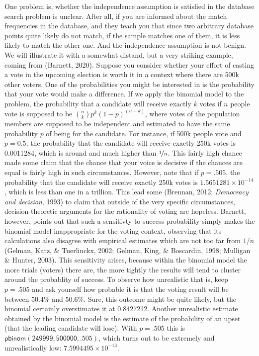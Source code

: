 \documentclass[10pt,dvipsnames,enabledeprecatedfontcommands]{scrartcl}
\begin{document}
One problem is, whether the independence assumption is satisfied in the
database search problem is unclear. After all, if you are informed about
the match frequencies in the database, and they teach you that since two
arbitrary database points quite likely do not match, if the sample
matches one of them, it is less likely to match the other one. And the
independence assumption is not benign. We will illustrate it with a
somewhat distand, but a very striking example, coming from (Barnett,
2020). Suppose you consider whether your effort of casting a vote in the
upcoming election is worth it in a context where there are 500k other
voters. One of the probabilities you might be interested in is the
probability that your vote would make a difference. If we apply the
binomial model to the problem, the probability that a candidate will
receive exactly \(k\) votes if \(n\) people vote is supposed to be
\({n \choose k} p^{k} (1-p)^{(n-k)}\), where votes of the population
members are supposed to be independent and estimated to have the same
probability \(p\) of being for the candidate. For instance, if 500k
people vote and \(p= 0.5\), the probability that the candidate will
receive exactly 250k votes is 0.0011284, which is around
 and much higher than \(\nicefrac{1}{n}\). This fairly
high chance made some claim that the chance that your voice is decisive
if the chances are equal is fairly high in such circumstances. However,
note that if \(p=.505\), the probability that the candidate will receive
exactly 250k votes is \ensuremath{1.5651281\times 10^{-14}}, which is
less than one in a trillion. This lead some (Brennan, 2012;
\emph{Democracy and decision}, 1993) to claim that outside of the very
specific circumstances, decision-theoretic arguments for the rationality
of voting are hopeless. Barnett, however, points out that such a
sensitivty to success probability simply makes the binomial model
inappropriate for the voting context, observing that its calculations
also disagree with empirical estimates which are not too far from
\(1/n\) (Gelman, Katz, \& Tuerlinckx, 2002; Gelman, King, \& Boscardin,
1998; Mulligan \& Hunter, 2003). This sensitivity arises, because within
the binomial model the more trials (voters) there are, the more tightly
the results will tend to cluster around the probablity of success. To
observe how unrealistic that is, keep \(p=.505\) and ask yourself how
probable it is that the voting result will be between \(50.4\%\) and
\(50.6\%\). Sure, this outcome might be quite likely, but the binomial
certainly overstimates it at 0.8427212. Another unrealistic estimate
obtained by the binomial model is the estimate of the probability of an
upset (that the leading candidate will lose). With \(p=.505\) this is
\(\mathsf{pbinom(249999,500000,.505)}\), which turns out to be extremely
and unrealistically low: \ensuremath{7.5994495\times 10^{-13}}.
\end{document}

